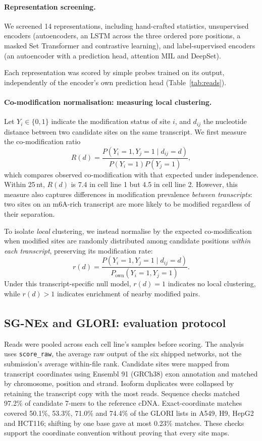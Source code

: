 \documentclass[11pt,a4paper]{article}
\makeatletter
\newcounter{appmarknum}
\DeclareRobustCommand{\appmark}[1]{%
    \refstepcounter{appmarknum}\label{appmark@#1}%
    \textsuperscript{\arabic{appmarknum}}}
\makeatother
\begin{document}
\paragraph{Representation screening.}
We screened 14 representations, including hand-crafted statistics, unsupervised encoders (autoencoders, an LSTM across the three ordered pore positions, a masked Set Transformer and contrastive learning), and label-supervised encoders (an autoencoder with a prediction head, attention MIL and DeepSet).

Each representation was scored by simple probes trained on its output, independently of the encoder's own prediction head (Table~\ref{tab:reads}).

\label{app:cluster-protocol}
\paragraph{Co-modification normalisation: measuring local clustering.}
Let $Y_i\in\{0,1\}$ indicate the modification status of site $i$, and $d_{ij}$ the nucleotide distance between two candidate sites on the same transcript. We first measure the co-modification ratio
\[
R(d)=
\frac{P(Y_i=1,Y_j=1\mid d_{ij}=d)}
{P(Y_i=1)P(Y_j=1)},
\]
which compares observed co-modification with that expected under independence. Within 25\,nt, $R(d)$ is 7.4 in cell line 1 but 4.5 in cell line 2. However, this measure also captures differences in modification prevalence \emph{between transcripts}: two sites on an m6A-rich transcript are more likely to be modified regardless of their separation.

To isolate \emph{local} clustering, we instead normalise by the expected co-modification when modified sites are randomly distributed among candidate positions \emph{within each transcript}, preserving its modification rate:
\[
r(d)=
\frac{P(Y_i=1,Y_j=1\mid d_{ij}=d)}
{P_{\mathrm{own}}(Y_i=1,Y_j=1)}.
\]
Under this transcript-specific null model, $r(d)=1$ indicates no local clustering, while $r(d)>1$ indicates enrichment of nearby modified pairs.

\subsection*{SG-NEx and GLORI: evaluation protocol\texorpdfstring{\appmark{app:glori-protocol}}{}}
\label{app:glori-protocol}
Reads were pooled across each cell line's samples before scoring. The analysis
uses \texttt{score\_raw}, the average raw output of the six shipped networks,
not the submission's average within-file rank. Candidate sites were mapped
from transcript coordinates using Ensembl 91 (GRCh38) exon annotation and
matched by chromosome, position and strand. Isoform duplicates were collapsed
by retaining the transcript copy with the most reads. Sequence checks matched
97.2\% of candidate 7-mers to the reference cDNA. Exact-coordinate matches
covered 50.1\%, 53.3\%, 71.0\% and 74.4\% of the GLORI lists in A549, H9,
HepG2 and HCT116; shifting by one base gave at most 0.23\% matches. These
checks support the coordinate convention without proving that every site maps.
\end{document}
